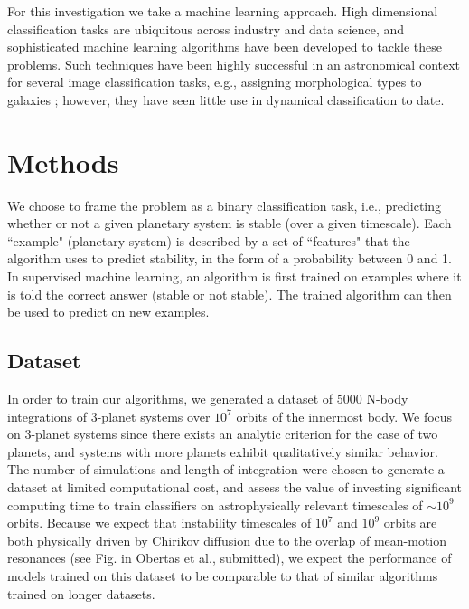 For this investigation we take a machine learning approach.
High dimensional classification tasks are ubiquitous across industry and data science, and sophisticated machine learning algorithms have been developed to tackle these problems.
Such techniques have been highly successful in an astronomical context for several image classification tasks, e.g., assigning morphological types to galaxies \citep{Collister04}; however, they have seen little use in dynamical classification to date\citep[see][for a recent counterexample]{Petrovich15}.
 
\section{Methods}
We choose to frame the problem as a binary classification task, i.e., predicting whether or not a given planetary system is stable (over a given timescale).
Each ``example" (planetary system) is described by a set of ``features" that the algorithm uses to predict stability, in the form of a probability between 0 and 1.
In supervised machine learning, an algorithm is first trained on examples where it is told the correct answer (stable or not stable).
The trained algorithm can then be used to predict on new examples.

\subsection{Dataset} \label{dataset}
In order to train our algorithms, we generated a dataset of 5000 N-body integrations of 3-planet systems over $10^7$ orbits of the innermost body.
We focus on 3-planet systems since there exists an analytic criterion for the case of two planets, and systems with more planets exhibit qualitatively similar behavior.
The number of simulations and length of integration were chosen to generate a dataset at limited computational cost, and assess the value of investing significant computing time to train classifiers on astrophysically relevant timescales of $\sim 10^9$ orbits.
Because we expect that instability timescales of $10^7$ and $10^9$ orbits are both physically driven by Chirikov diffusion due to the overlap of mean-motion resonances (see Fig. in Obertas et al., submitted), we expect the performance of models trained on this dataset to be comparable to that of similar algorithms trained on longer datasets.


